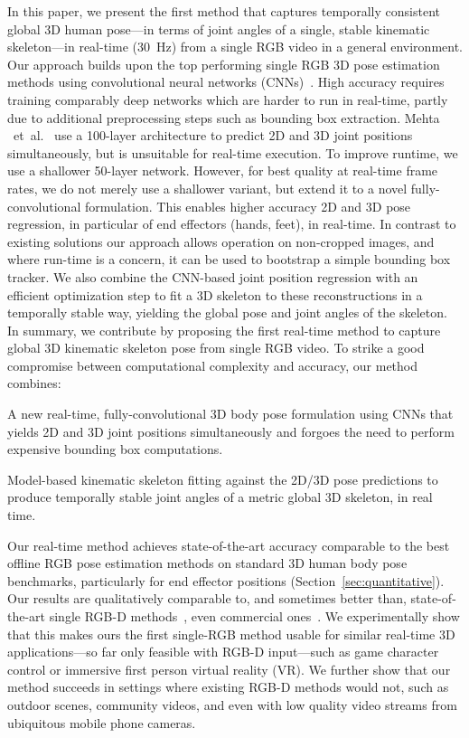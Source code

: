 \documentclass[acmtog]{acmart}
\newcommand{\etal}{~et~al.\ }
\newcommand{\change}[1]{{#1}}
\newenvironment{packed_itemize}
{\begin{itemize}
    \setlength{\itemsep}{1pt}
    \setlength{\parskip}{0pt}
    \setlength{\parsep}{0pt}
}{\end{itemize}}
\begin{document}
In this paper, we present the first method that captures temporally consistent global {3D} human pose---in terms of joint angles of a single, stable kinematic skeleton---in real-time (30~Hz) from a single RGB video in a general environment.
Our approach builds upon the top performing single RGB 3D pose estimation methods using convolutional neural networks (CNNs)~\cite{pavlakos_volumetric3d_arxiv16,mehta_mlc3d_arxiv16}.
High accuracy requires training comparably deep networks which are harder to run in real-time, \change{partly due to} additional preprocessing steps such as bounding box extraction.
Mehta \etal {} use a 100-layer architecture to predict 2D and 3D joint positions simultaneously, but is unsuitable for real-time execution.
To improve runtime, we use a shallower 50-layer network.
However, for best quality at real-time frame rates, we do not merely use a shallower variant, but extend it to a \change{novel} fully-convolutional formulation.
This enables higher accuracy 2D and 3D pose regression, in particular of end effectors (hands, feet), in real-time.
In contrast to existing solutions our approach allows operation on non-cropped images, {and where run-time is a concern, it can be used to bootstrap a simple bounding box tracker.}
We also combine the CNN-based joint position regression with an efficient optimization step to fit a 3D skeleton to these reconstructions in a temporally stable way,{ yielding the global pose and joint angles of the skeleton.}
In summary, we contribute \change{by proposing the first real-time method to capture global 3D kinematic skeleton pose from single RGB video.}
To strike a good compromise between computational complexity and accuracy\change{, our method} combines:
\begin{packed_itemize}
\item A new real-time, fully-convolutional \change{3D body pose formulation using CNNs} that yields 2D and 3D joint positions simultaneously and forgoes the need to perform expensive bounding box computations. 
\item Model-based kinematic skeleton fitting against \change{the} 2D/3D pose predictions to produce temporally stable \change{joint angles of a metric global 3D skeleton}, in real time.
\end{packed_itemize}

Our real-time method achieves state-of-the-art accuracy comparable to the best offline RGB pose estimation methods on standard 3D human body pose benchmarks, particularly for end effector positions (Section~\ref{sec:quantitative}). Our results are qualitatively comparable to, and sometimes better than, state-of-the-art single \mbox{RGB-D} methods~\cite{girshick2011efficient}, even commercial ones~\cite{kinectsdk}. 
We experimentally show that this makes ours the first single-RGB method usable for similar real-time 3D applications---so far only feasible with \mbox{RGB-D} input---such as game character control or immersive first person virtual reality (VR). We further show that our method succeeds \change{in settings where existing \mbox{RGB-D} methods would not, such as} outdoor scenes, community videos, and even with \change{low quality video streams from} ubiquitous mobile phone cameras. 
\end{document}
